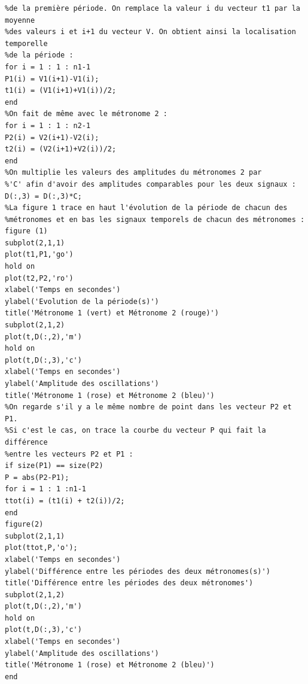 \documentclass[a4paper,11pt]{report}
\begin{document}
\begin{verbatim}
%de la première période. On remplace la valeur i du vecteur t1 par la moyenne
%des valeurs i et i+1 du vecteur V. On obtient ainsi la localisation temporelle
%de la période :
for i = 1 : 1 : n1-1
P1(i) = V1(i+1)-V1(i);
t1(i) = (V1(i+1)+V1(i))/2;
end
%On fait de même avec le métronome 2 :
for i = 1 : 1 : n2-1
P2(i) = V2(i+1)-V2(i);
t2(i) = (V2(i+1)+V2(i))/2;
end
%On multiplie les valeurs des amplitudes du métronomes 2 par
%'C' afin d'avoir des amplitudes comparables pour les deux signaux :
D(:,3) = D(:,3)*C;
%La figure 1 trace en haut l'évolution de la période de chacun des
%métronomes et en bas les signaux temporels de chacun des métronomes :
figure (1)
subplot(2,1,1)
plot(t1,P1,'go')
hold on
plot(t2,P2,'ro')
xlabel('Temps en secondes')
ylabel('Evolution de la période(s)')
title('Métronome 1 (vert) et Métronome 2 (rouge)')
subplot(2,1,2)
plot(t,D(:,2),'m')
hold on
plot(t,D(:,3),'c')
xlabel('Temps en secondes')
ylabel('Amplitude des oscillations')
title('Métronome 1 (rose) et Métronome 2 (bleu)')
%On regarde s'il y a le même nombre de point dans les vecteur P2 et P1.
%Si c'est le cas, on trace la courbe du vecteur P qui fait la différence
%entre les vecteurs P2 et P1 :
if size(P1) == size(P2)
P = abs(P2-P1);
for i = 1 : 1 :n1-1
ttot(i) = (t1(i) + t2(i))/2;
end
figure(2)
subplot(2,1,1)
plot(ttot,P,'o');
xlabel('Temps en secondes')
ylabel('Différence entre les périodes des deux métronomes(s)')
title('Différence entre les périodes des deux métronomes')
subplot(2,1,2)
plot(t,D(:,2),'m')
hold on
plot(t,D(:,3),'c')
xlabel('Temps en secondes')
ylabel('Amplitude des oscillations')
title('Métronome 1 (rose) et Métronome 2 (bleu)')
end
\end{verbatim}
\end{document}
